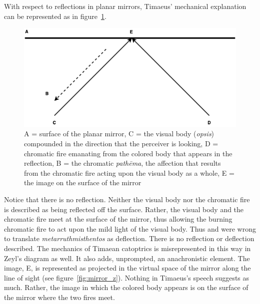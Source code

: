 With respect to reflections in planar mirrors, Timaeus' mechanical explanation can be represented as in figure~\ref{fig:mirror}.
\begin{figure}[htbp]
	\centering
		\includegraphics[scale=.4]{graphics/mirror.png}
	\caption{A = surface of the planar mirror, C = the visual body (\emph{opsis}) compounded in the direction that the perceiver is looking, D = chromatic fire emanating from the colored body that appears in the reflection, B = the chromatic \emph{pathēma}, the affection that results from the chromatic fire acting upon the visual body as a whole, E = the image on the surface of the mirror}
	\label{fig:mirror}
\end{figure}
Notice that there is no reflection. Neither the visual body nor the chromatic fire is described as being reflected off the surface. Rather, the visual body and the chromatic fire meet at the surface of the mirror, thus allowing the burning chromatic fire to act upon the mild light of the visual body. Thus \citet[159]{Archer-Hind:1888qd} and \citet[103]{Bury:1929jb} were wrong to translate \emph{metarruthmisthentos} as deflection. There is no reflection or deflection described. The mechanics of Timaean catoptrics is misrepresented in this way in Zeyl's \citeyearpar[34 n 45]{Zeyl:2000cs} diagram as well. It also adds, unprompted, an anachronistic element. The image, E, is represented as projected in the virtual space of the mirror along the line of sight (see figure~\ref{fig:mirror_z}). Nothing in Timaeus's speech suggests as much. Rather, the image in which the colored body appears is on the surface of the mirror where the two fires meet.

